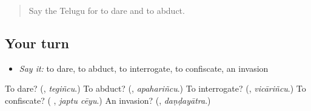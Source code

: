 \label{lesson:TE-R381-review-final-381}



\begin{quote}
Say the Telugu for to dare and to abduct.
\end{quote}

\subsection*{Your turn}
\begin{itemize}
\raggedright
  \item \emph{Say it:} to dare, to abduct, to interrogate, to confiscate, an invasion
\end{itemize}

\begin{tcolorbox}[breakable,colback=teal!4,colframe=teal!35!black,title={Before you move on}]
To dare? (\textbf{}, \emph{tegiñcu}.) To abduct? (\textbf{}, \emph{apahariñcu}.) To interrogate? (\textbf{}, \emph{vicāriñcu}.) To confiscate? (\textbf{ }, \emph{japtu cēyu}.) An invasion? (\textbf{}, \emph{daṇḍayātra}.)
\end{tcolorbox}
